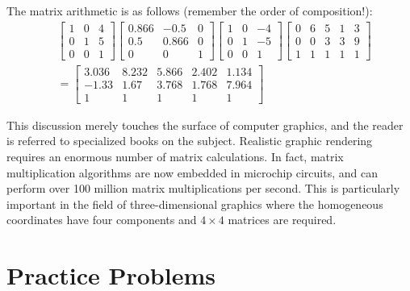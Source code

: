 \documentclass{ximera}
\begin{document}
\begin{example}
\begin{explanation}
\begin{center}
\end{center}

The matrix arithmetic is as follows (remember the order of composition!):
\begin{align*}
& \left[
\begin{array}{rrr}
1 & 0 & 4\\
0 & 1 & 5\\
0 & 0 & 1
\end{array}
\right]
\left[
\begin{array}{lrr}
0.866 & -0.5 & 0\\
0.5 & 0.866 & 0\\
0 & 0 & 1
\end{array}
\right]
\left[
\begin{array}{rrr}
1 & 0 & -4\\
0 & 1 & -5\\
0 & 0 & 1
\end{array}
\right]
\left[
\begin{array}{rrrrr}
0 & 6 & 5 & 1 & 3\\
0 & 0 & 3 & 3 & 9 \\
1 & 1 & 1 & 1 & 1
\end{array}
\right] \\
&= \left[
\begin{array}{lllll}
3.036 & 8.232 & 5.866 & 2.402 & 1.134\\
-1.33 & 1.67 & 3.768 & 1.768 & 7.964 \\
1 & 1 & 1 & 1 & 1
\end{array}
\right]
\end{align*}

\end{explanation}
\end{example}

This discussion merely touches the
surface of computer graphics, and the reader is referred to specialized
books on the subject. Realistic graphic rendering requires an enormous
number of matrix calculations. In fact, matrix multiplication algorithms
 are now embedded in microchip circuits, and can perform over 100
million matrix multiplications per second. This is particularly
important in the field of three-dimensional graphics where the
homogeneous coordinates have four components and $4 \times 4$ matrices are
required.


\section*{Practice Problems}
\end{document}
